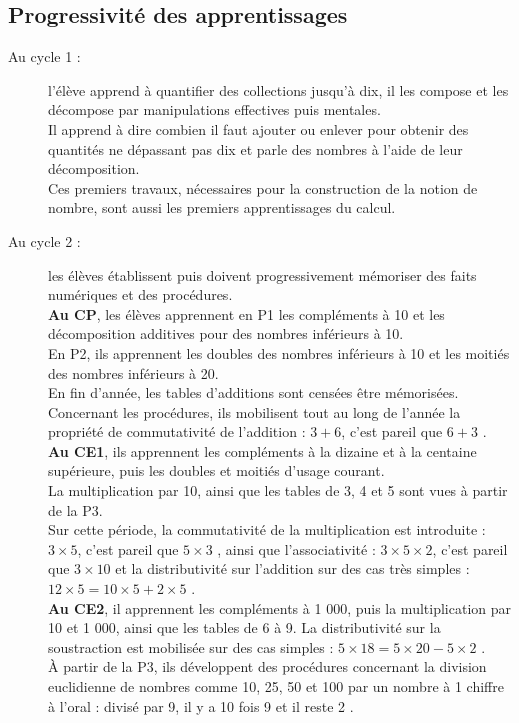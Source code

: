\subsection{Progressivité des apprentissages} 

\begin{description}
   \item[Au cycle 1 :] l’élève apprend à quantifier des collections jusqu’à dix, il les compose et les décompose par manipulations effectives puis mentales. \\
   Il apprend à dire combien il faut ajouter ou enlever pour obtenir des quantités ne dépassant pas dix et parle des nombres à l’aide de leur décomposition. \\
   Ces premiers travaux, nécessaires pour la construction de la notion de nombre, sont aussi les premiers apprentissages du calcul.
   
   \item[Au cycle 2 :] les élèves établissent puis doivent progressivement mémoriser des faits numériques et des procédures. \\
      {\bf Au CP}, les élèves apprennent en P1 les compléments à 10 et les décomposition additives pour des nombres inférieurs à 10. \\
      En P2, ils apprennent les doubles des nombres inférieurs à 10 et les moitiés des nombres inférieurs à 20. \\
      En fin d'année, les tables d'additions sont censées être mémorisées. \\
         Concernant les procédures, ils mobilisent tout au long de l'année la propriété de commutativité de l'addition : \og $3+6$, c'est pareil que $6+3$ \fg. \\
      {\bf Au CE1}, ils apprennent les compléments à la dizaine et à la centaine supérieure, puis les doubles et moitiés d'usage courant. \\
         La multiplication par 10, ainsi que les tables de 3, 4 et 5 sont vues à partir de la P3. \\
         Sur cette période, la commutativité de la multiplication est introduite : \og $3\times5$, c’est pareil que $5\times3$ \fg, ainsi que l'associativité : \og $3\times5\times2$, c’est pareil que $3\times10$ \fg{} et la distributivité sur l'addition sur des cas très simples : \og $12\times5 =10\times5+2\times5$ \fg. \\
      {\bf Au CE2}, il apprennent les compléments à 1 000, puis la multiplication par 10 et 1 000, ainsi que les tables de 6 à 9. La distributivité sur la soustraction est mobilisée sur des cas simples : \og $5\times18 =5\times20-5\times2$ \fg. \\
         À partir de la P3, ils développent des procédures concernant la division euclidienne de nombres comme 10, 25, 50 et 100 par un nombre à 1 chiffre à l'oral :  divisé par 9, il y a 10 fois 9 et il reste 2 \fg.
         

\end{description}

